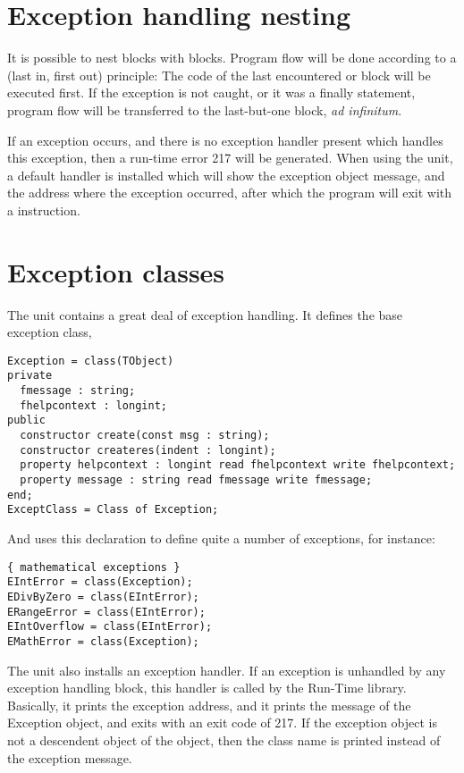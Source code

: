 \section{Exception handling nesting}
It is possible to nest  blocks with 
blocks. Program flow will be done according to a  (last in, first
out) principle: The code of the last encountered  or
  block will be executed first. If the exception is not
caught, or it was a finally statement, program flow will be transferred to
the last-but-one block, {\em ad infinitum}.

If an exception occurs, and there is no exception handler present which
handles this exception, then a run-time error 217 will be generated.
When using the  unit, a default handler is installed which will show the exception object message, and the
address where the exception occurred, after which the program will exit with
a  instruction.


\section{Exception classes}
\label{se:exceptclasses}
The  unit contains a great deal of exception handling.
It defines the base exception class, 
\begin{verbatim}
Exception = class(TObject)
private
  fmessage : string;
  fhelpcontext : longint;
public
  constructor create(const msg : string);
  constructor createres(indent : longint);
  property helpcontext : longint read fhelpcontext write fhelpcontext;
  property message : string read fmessage write fmessage;
end;
ExceptClass = Class of Exception;
\end{verbatim}
And uses this declaration to define quite a number of exceptions, for
instance:
\begin{verbatim}
{ mathematical exceptions }
EIntError = class(Exception);
EDivByZero = class(EIntError);
ERangeError = class(EIntError);
EIntOverflow = class(EIntError);
EMathError = class(Exception);
\end{verbatim}
The  unit also installs an exception handler. If an exception is
unhandled by any exception handling block, this handler is called by the
Run-Time library. Basically, it prints the exception address, and it prints
the message of the Exception object, and exits with an exit code of 217.
If the exception object is not a descendent object of the 
object, then the class name is printed instead of the exception message.

